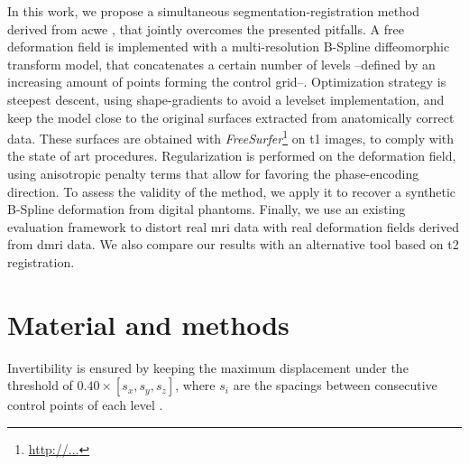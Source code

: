 \documentclass{llncs}
\begin{document}
In this work, we propose a simultaneous segmentation-registration
  method derived from \gls*{acwe} \cite{chan_active_2001}, that
  jointly overcomes the presented pitfalls.
A free deformation field is implemented with a multi-resolution 
  B-Spline diffeomorphic transform model, that concatenates a 
  certain number of levels --defined by an increasing amount of points
  forming the control grid--.
Optimization strategy is steepest descent, using shape-gradients
  \cite{jehan-besson_dream2s:_2003} to avoid a levelset implementation,
  and keep the model close to the original surfaces extracted from
  anatomically correct data.
These surfaces are obtained with \emph{FreeSurfer}\footnote{\url{http://...}}
  on \gls*{t1} images, to comply with the state of art procedures.
Regularization is performed on the deformation field, using anisotropic
  penalty terms that allow for favoring the phase-encoding direction.
To assess the validity of the method, we apply it to recover
  a synthetic B-Spline deformation from digital phantoms.
Finally, we use an existing evaluation framework \cite{esteban_phantom_2014}
  to distort real \gls*{mri} data with real deformation fields derived
  from \gls*{dmri} data.
We also compare our results with an alternative tool based on \gls*{t2}
  registration.
  
\section{Material and methods}\label{sec:methods}

Invertibility is ensured by keeping the maximum displacement under
  the threshold of $0.40 \times [ s_x, s_y, s_z ]$, where $s_i$ are
  the spacings between consecutive control points of each level
  \cite{rueckert_diffeomorphic_2006}.




\end{document}
